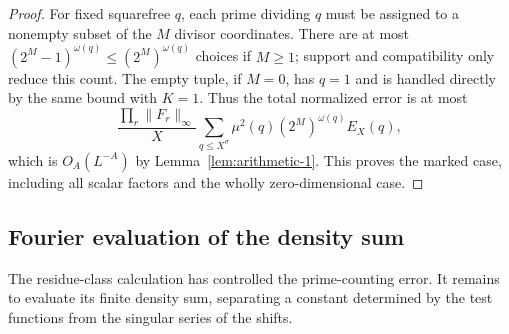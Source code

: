 \begin{proof}
For fixed squarefree $q$, each prime dividing $q$ must be assigned to a nonempty subset of the $M$ divisor coordinates. There are at most $(2^M-1)^{\omega(q)}\le (2^M)^{\omega(q)}$ choices if $M\ge1$; support and compatibility only reduce this count. The empty tuple, if $M=0$, has $q=1$ and is handled directly by the same bound with $K=1$. Thus the total normalized error is at most
\[
\frac{\prod_r\|F_r\|_\infty}{X}
 \sum_{q\le X^\sigma}\mu^2(q)(2^M)^{\omega(q)}E_X(q),
\]
which is $O_A(L^{-A})$ by Lemma~\ref{lem:arithmetic-1}. This proves the marked case, including all scalar factors and the wholly zero-dimensional case. \end{proof}

\subsection{Fourier evaluation of the density sum}

The residue-class calculation has controlled the prime-counting error.
It remains to evaluate its finite density sum, separating a constant
determined by the test functions from the singular series of the shifts.

